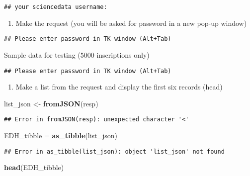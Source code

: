 \documentclass[]{article}
\newenvironment{Shaded}{\begin{snugshade}}{\end{snugshade}}
\newcommand{\KeywordTok}[1]{\textcolor[rgb]{0.13,0.29,0.53}{\textbf{#1}}}
\newcommand{\NormalTok}[1]{#1}
\newcommand{\StringTok}[1]{\textcolor[rgb]{0.31,0.60,0.02}{#1}}
\providecommand{\tightlist}{%
  \setlength{\itemsep}{0pt}\setlength{\parskip}{0pt}}
\begin{document}
\begin{verbatim}
## your sciencedata username:
\end{verbatim}

\begin{enumerate}
\def\labelenumi{\arabic{enumi}.}
\setcounter{enumi}{1}
\tightlist
\item
  Make the request (you will be asked for password in a new pop-up
  window)
\end{enumerate}

\begin{verbatim}
## Please enter password in TK window (Alt+Tab)
\end{verbatim}

Sample data for testing (5000 inscriptions only)

\begin{verbatim}
## Please enter password in TK window (Alt+Tab)
\end{verbatim}

\begin{enumerate}
\def\labelenumi{\arabic{enumi}.}
\setcounter{enumi}{2}
\tightlist
\item
  Make a list from the request and display the first six records (head)
\end{enumerate}

\begin{Shaded}
\begin{Highlighting}[]
\NormalTok{list_json <-}\StringTok{ }\KeywordTok{fromJSON}\NormalTok{(resp)}
\end{Highlighting}
\end{Shaded}

\begin{verbatim}
## Error in fromJSON(resp): unexpected character '<'
\end{verbatim}

\begin{Shaded}
\begin{Highlighting}[]
\NormalTok{EDH_tibble =}\StringTok{ }\KeywordTok{as_tibble}\NormalTok{(list_json)}
\end{Highlighting}
\end{Shaded}

\begin{verbatim}
## Error in as_tibble(list_json): object 'list_json' not found
\end{verbatim}

\begin{Shaded}
\begin{Highlighting}[]
\KeywordTok{head}\NormalTok{(EDH_tibble)}
\end{Highlighting}
\end{Shaded}
\end{document}
